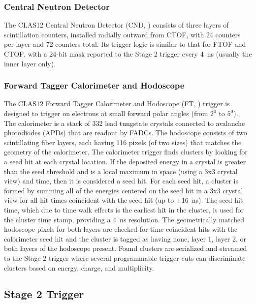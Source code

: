 \subsubsection{Central Neutron Detector}

The CLAS12 Central Neutron Detector (CND, \cite{cnd-ref}) consists of three layers of scintillation counters, installed radially outward from CTOF, with 24 counters per layer and 72 counters total. Its trigger logic is similar to that for FTOF and CTOF, with a 24-bit mask reported to the Stage 2 trigger every 4~ns (usually the inner layer only).


\subsubsection{Forward Tagger Calorimeter and Hodoscope}

The CLAS12 Forward Tagger Calorimeter and Hodoscope (FT, \cite{ft-ref}) trigger is designed to trigger on electrons at small forward polar angles (from $2^0$  to $5^0$). The calorimeter is a stack of 332 lead tungstate crystals connected to avalanche photodiodes (APDs) that are readout by FADCs. The hodoscope consists of two scintillating fiber layers, each having 116 pixels (of two sizes) that matches the geometry of the calorimeter. The calorimeter trigger finds clusters by looking for a seed hit at each crystal location. If the deposited energy in a crystal is greater than the seed threshold and is a local maximum in space (using a 3x3 crystal view) and time, then it is considered a seed hit. For each seed hit, a cluster is formed by summing all of the energies centered on the seed hit in a 3x3 crystal view for all hit times coincident with the seed hit (up to $\pm$16~ns). The seed hit time, which due to time walk effects is the earliest hit in the cluster, is used for the cluster time stamp, providing a 4~ns resolution. The geometrically matched hodoscope pixels for both layers are checked for time coincident hits with the calorimeter seed hit and the cluster is tagged as having none, layer 1, layer 2, or both layers of the hodoscope present. Found clusters are serialized and streamed to the Stage 2 trigger where several programmable trigger cuts can discriminate clusters based on energy, charge, and multiplicity.


\subsection{Stage 2 Trigger}

